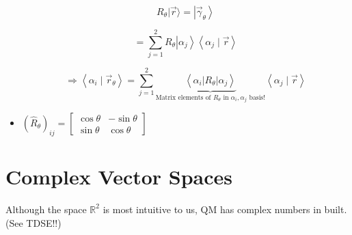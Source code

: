 \documentclass{article}
\begin{document}
\begin{itemize}
$$R_{\theta}|\vec{r}\rangle =\left|\vec{\gamma}_{\theta}\right\rangle$$

$$=\sum_{j=1}^{2} R_{\theta}\left|\alpha_{j}\right\rangle\left\langle\alpha_{j} \mid \vec{r}\right\rangle$$

$$\Rightarrow\left\langle\alpha_{i} \mid \vec{r}_{\theta}\right\rangle =\sum_{j=1}^{2} \underbrace{ \left\langle\alpha_{i}\left|R_{\theta}\right| \alpha_{j}\right\rangle}_{\text{Matrix elements of } R_{\theta} \text{ in } \alpha_{i}, \alpha_{j} \text{ basis!}} \left\langle\alpha_{j} \mid \vec{r}\right\rangle$$

\item $\left(\hat{R}_{\theta}\right)_{i j}=\left[\begin{array}{cc}
\cos \theta & -\sin \theta \\
\sin \theta & \cos \theta
\end{array}\right]$

\end{itemize}

\section{Complex Vector Spaces}

Although the space $\mathbb{R}^{2}$ is most intuitive to us, QM has complex numbers in built. (See TDSE!!)
\end{document}
